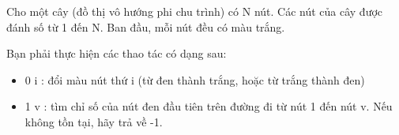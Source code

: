 Cho một cây (đồ thị vô hướng phi chu trình) có N nút. Các nút của cây được đánh số từ 1 đến N. Ban đầu, mỗi nút đều có màu trắng.

Bạn phải thực hiện các thao tác có dạng sau:
\begin{itemize}
	\item 0 i : đổi màu nút thứ i (từ đen thành trắng, hoặc từ trắng thành đen)
	\item 1 v : tìm chỉ số của nút đen đầu tiên trên đường đi từ nút 1 đến nút v. Nếu không tồn tại, hãy trả về -1.
\end{itemize}